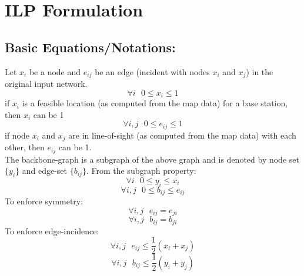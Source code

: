 \documentclass[letterpaper, 12pt]{article}
\begin{document}
\section*{ILP Formulation}
\subsection*{Basic Equations/Notations: }Let $x_{i}$ be a node and $e_{ij}$ be
an edge (incident with nodes $x_i$ and $x_j$) in the original input network. 
\begin{equation}
	\forall i \mbox{ } 0 \leq x_i \leq 1 
\end{equation} 
\indent if $x_i$ is a feasible location (as computed from the map data) for a
base station, then $x_i$ can be 1
\begin{equation}
	\forall i,j \mbox{ } 0 \leq e_{ij} \leq 1 
\end{equation} 
\indent if node $x_i$ and $x_j$ are in line-of-sight (as computed
	from the map data) with each other, then $e_{ij}$ can be 1.\\
The backbone-graph is a subgraph of the above graph and is denoted by node set
$\{y_i\}$ and edge-set $\{b_{ij}\}$. From the subgraph property:
\begin{equation}
	\forall i \mbox{ } 0 \leq y_{i} \leq x_{i}
\end{equation}
\begin{equation}
	\forall i,j \mbox{ } 0 \leq b_{ij} \leq e_{ij}
\end{equation}
To enforce symmetry:
\begin{equation}
	\forall i,j \mbox{ } e_{ij} = e_{ji}
\end{equation}
\begin{equation}
	\forall i,j \mbox{ } b_{ij} = b_{ji}
\end{equation}
To enforce edge-incidence:
\begin{equation}
	\forall i,j \mbox{ } e_{ij} \leq \frac{1}{2}(x_i + x_j)
\end{equation}
\begin{equation}
	\forall i,j \mbox{ } b_{ij} \leq \frac{1}{2}(y_i + y_j)
\end{equation}
\end{document}

